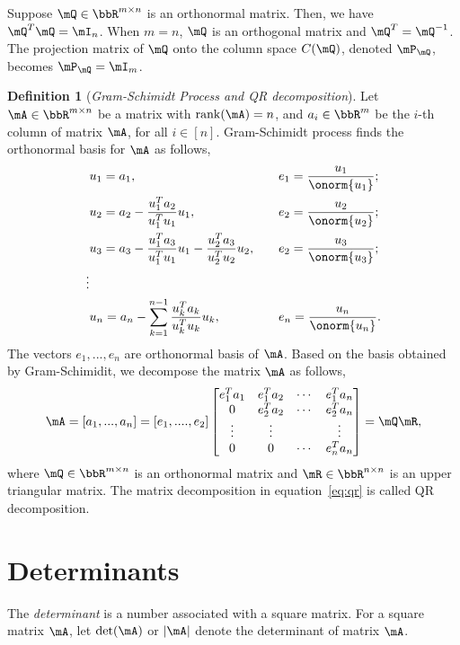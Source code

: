 \documentclass[11pt]{article}
\DeclareMathOperator{\rank}{rank}
\theoremstyle{plain}
\theoremstyle{definition}
\newtheorem{defn}{Definition}
\begin{document}
Suppose $\mQ \in \bbR^{m \times n}$ is an orthonormal matrix. Then, we have $\mQ^T \mQ = \mI_n$.  When $m = n$, $\mQ$ is an orthogonal matrix and $\mQ^T = \mQ^{-1}$. The projection matrix of $\mQ$ onto the column space $C(\mQ)$, denoted $\mP_{\mQ}$,  becomes $\mP_{\mQ} = \mI_m$.

\begin{defn}[\textit{Gram-Schimidt Process and QR decomposition}]\label{gram-schimidt}
Let $\mA \in \bbR^{m \times n}$ be a matrix with $\rank(\mA) = n$, and  $a_i \in \bbR^{m}$ be the $i$-th column of matrix $\mA$, for all $i \in [n]$. Gram-Schimidt process finds the orthonormal basis for $\mA$ as follows,
\begin{align}
	&u_1 = a_1, &&\quad e_1 = \frac{u_1}{\onorm{u_1}};\\
	&u_2 = a_2 - \frac{u_1^T a_2}{u_1^T u_1} u_1 ,&&\quad  e_2 = \frac{u_2}{\onorm{u_2}};\\
	&u_3 = a_3 - \frac{u_1^T a_3}{u_1^T u_1} u_1 - \frac{u_2^T a_3}{u_2^T u_2} u_2,&&\quad  e_2 = \frac{u_3}{\onorm{u_3}};\\
	\vdots\\
	&u_n = a_n - \sum_{k = 1}^{n-1} \frac{u_k^T a_k}{u_k^T u_k} u_k, && \quad e_n = \frac{u_n}{\onorm{u_n}}.
\end{align}
 The vectors $e_1,...,e_n$ are orthonormal basis of $\mA$. Based on the basis obtained by Gram-Schimidit, we decompose the matrix $\mA$ as follows,
 \begin{equation}\label{eq:qr}
 	\mA = [a_1,...,a_n] = [e_1,....,e_2] \begin{bmatrix}
 		e_1^T a_1 & e_1^T a_2 & \cdots & e_1^T a_n\\
 		0&e_2^T a_2 & \cdots & e_2^T a_n\\
 		\vdots &\vdots & & \vdots \\
 		0 &0&\cdots & e_n^T a_n
 	\end{bmatrix} = \mQ \mR,
 \end{equation}
	where $\mQ \in \bbR^{m \times n}$ is an orthonormal matrix and $\mR \in \bbR^{n \times n}$ is an upper triangular matrix. The matrix decomposition in equation~\eqref{eq:qr} is called QR decomposition.
\end{defn}

\section{Determinants}
The \textit{determinant} is a number associated with a square matrix. For a square matrix $\mA$, let $\det(\mA)$ or $|\mA|$ denote the determinant of matrix $\mA$.
\end{document}
